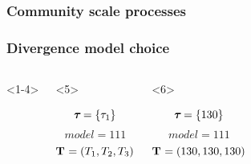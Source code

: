 \begin{frame}
    \frametitle<1-4>{Community scale processes}
    \frametitle<5->{Divergence model choice}
    \begin{columns}[c]
        \begin{onlyenv}<1-4>
            \begin{minipage}[c][0.5\textheight][c]{\linewidth}
            \end{minipage}
        \end{onlyenv}
        \begin{onlyenv}<5>
            \begin{minipage}[c][0.5\textheight][c]{\linewidth}
                \begin{displaybox}[0.95\linewidth]
                    \begin{minipage}[c][0.45\textheight][c]{0.95\linewidth}
                        \[
                            \boldsymbol{\tau_{}} = \{\tau_{1}\}
                        \]\vspace{0mm}
                        \[
                            model = 111
                        \]\vspace{0mm}
                        \[
                            \mathbf{T_{}} = (T_{1},T_{2},T_{3})
                        \]\vspace{0mm}
                    \end{minipage}
                \end{displaybox}
            \end{minipage}
        \end{onlyenv}
        \begin{onlyenv}<6>
            \begin{minipage}[c][0.5\textheight][c]{\linewidth}
                \begin{displaybox}[0.95\linewidth]
                    \begin{minipage}[c][0.45\textheight][c]{0.95\linewidth}
                        \[
                            \boldsymbol{\tau_{}} = \{130\}
                        \]\vspace{0mm}
                        \[
                            model = 111
                        \]\vspace{0mm}
                        \[
                            \mathbf{T_{}} = (130,130,130)
                        \]\vspace{0mm}

\end{minipage}
\end{displaybox}
\end{minipage}
\end{onlyenv}
\end{columns}
\end{frame}
